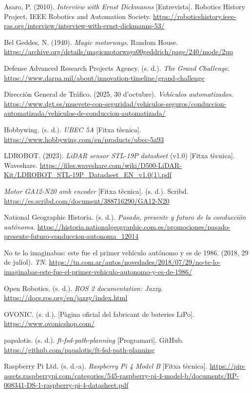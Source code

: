 \documentclass[11pt,a4paper]{article}
\begin{document}
{\setlength{\parskip}{0.6\baselineskip}\raggedright
{}

Asaro, P. (2010). \emph{Interview with Ernst Dickmanns} [Entrevista]. Robotics History Project, IEEE Robotics and Automation Society. \url{https://roboticshistory.ieee-ras.org/interview/interview-with-ernst-dickmanns-53/}

Bel Geddes, N. (1940). \emph{Magic motorways}. Random House. \url{https://archive.org/details/magicmotorways00geddrich/page/240/mode/2up}

Defense Advanced Research Projects Agency. (s. d.). \emph{The Grand Challenge}. \url{https://www.darpa.mil/about/innovation-timeline/grand-challenge}

Dirección General de Tráfico. (2025, 30 d’octubre). \emph{Vehículos automatizados}. \url{https://www.dgt.es/muevete-con-seguridad/vehiculos-seguros/conduccion-automatizada/vehiculos-de-conduccion-automatizada/}

Hobbywing. (s. d.). \emph{UBEC 5A} [Fitxa tècnica]. \url{https://www.hobbywing.com/en/products/ubec-5a93}

LDROBOT. (2023). \emph{LiDAR sensor STL-19P datasheet} (v1.0) [Fitxa tècnica]. Waveshare. \url{https://files.waveshare.com/wiki/D500-LiDAR-Kit/LDROBOT_STL-19P_Datasheet_EN_v1.0(1).pdf}

\emph{Motor GA12-N20 amb encoder} [Fitxa tècnica]. (s. d.). Scribd. \url{https://es.scribd.com/document/388716290/GA12-N20}

National Geographic Historia. (s. d.). \emph{Pasado, presente y futuro de la conducción autónoma}. \url{https://historia.nationalgeographic.com.es/promociones/pasado-presente-futuro-conduccion-autonoma_12014}

No te lo imaginabas: este fue el primer vehículo autónomo y es de 1986. (2018, 29 de juliol). \emph{TN}. \url{https://tn.com.ar/autos/novedades/2018/07/29/no-te-lo-imaginabas-este-fue-el-primer-vehiculo-autonomo-y-es-de-1986/}

Open Robotics. (s. d.). \emph{ROS 2 documentation: Jazzy}. \url{https://docs.ros.org/en/jazzy/index.html}

OVONIC. (s. d.). [Pàgina oficial del fabricant de bateries LiPo]. \url{https://www.ovonicshop.com/}

papalotis. (s. d.). \emph{ft-fsd-path-planning} [Programari]. GitHub. \url{https://github.com/papalotis/ft-fsd-path-planning}

Raspberry Pi Ltd. (s. d.-a). \emph{Raspberry Pi 4 Model B} [Fitxa tècnica]. \url{https://pip-assets.raspberrypi.com/categories/545-raspberry-pi-4-model-b/documents/RP-008341-DS-1-raspberry-pi-4-datasheet.pdf}

}
\end{document}
